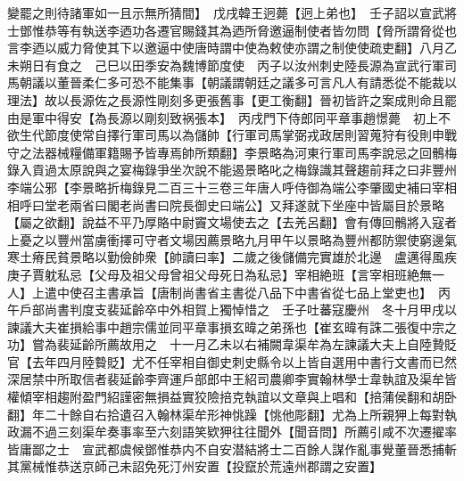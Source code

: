 變罷之則待諸軍如一且示無所猜間】　戊戌韓王迥薨【迥上弟也】　壬子詔以宣武將士鄧惟恭等有執送李迺功各遷官賜錢其為迺所脅邀逼制使者皆勿問【脅所謂脅從也言李迺以威力脅使其下以邀逼中使唐時謂中使為敕使亦謂之制使使疏吏翻】八月乙未朔日有食之　己巳以田季安為魏博節度使　丙子以汝州刺史陸長源為宣武行軍司馬朝議以董晉柔仁多可恐不能集事【朝議謂朝廷之議多可言凡人有請悉從不能裁以理法】故以長源佐之長源性剛刻多更張舊事【更工衡翻】晉初皆許之案成則命且罷由是軍中得安【為長源以剛刻致祸張本】　丙戌門下侍郎同平章事趙憬薨　初上不欲生代節度使常自擇行軍司馬以為儲帥【行軍司馬掌弼戎政居則習蒐狩有役則申戰守之法器械糧備軍籍賜予皆專焉帥所類翻】李景略為河東行軍司馬李說忌之回鶻梅錄入貢過太原說與之宴梅錄爭坐次說不能遏景略叱之梅錄識其聲趨前拜之曰非豐州李端公邪【李景略折梅錄見二百三十三卷三年唐人呼侍御為端公李肇國史補曰宰相相呼曰堂老兩省曰閣老尚書曰院長御史曰端公】又拜遂就下坐座中皆屬目於景略【屬之欲翻】說益不平乃厚賂中尉竇文場使去之【去羌呂翻】會有傳回鶻將入寇者上憂之以豐州當虜衝擇可守者文場因薦景略九月甲午以景略為豐州都防禦使窮邊氣寒土瘠民貧景略以勤儉帥衆【帥讀曰率】二歲之後儲備完實雄於北邊　盧邁得風疾庚子賈躭私忌【父母及祖父母曾祖父母死日為私忌】宰相絶班【言宰相班絶無一人】上遣中使召主書承旨【唐制尚書省主書從八品下中書省從七品上堂吏也】　丙午戶部尚書判度支裴延齡卒中外相賀上獨悼惜之　壬子吐蕃寇慶州　冬十月甲戌以諫議大夫崔損給事中趙宗儒並同平章事損玄暐之弟孫也【崔玄暐有誅二張復中宗之功】嘗為裴延齡所薦故用之　十一月乙未以右補闕韋渠牟為左諫議大夫上自陸贄貶官【去年四月陸䞇貶】尤不任宰相自御史刺史縣令以上皆自選用中書行文書而已然深居禁中所取信者裴延齡李齊運戶部郎中王紹司農卿李實翰林學士韋執誼及渠牟皆權傾宰相趨附盈門紹謹密無損益實狡險掊克執誼以文章與上唱和【掊蒲侯翻和胡卧翻】年二十餘自右拾遺召入翰林渠牟形神恌躁【恌他彫翻】尤為上所親狎上每對執政漏不過三刻渠牟奏事率至六刻語笑欵狎往往聞外【聞音問】所薦引咸不次遷擢率皆庸鄙之士　宣武都虞候鄧惟恭内不自安潜結將士二百餘人謀作亂事覺董晉悉捕斬其黨械惟恭送京師己未詔免死汀州安置【投竄於荒遠州郡謂之安置】

